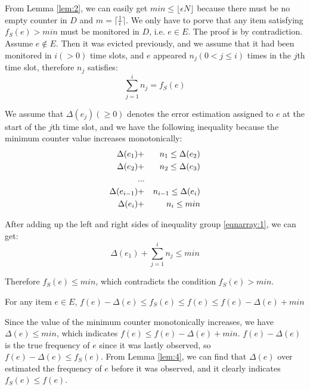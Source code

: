 \documentclass[conference]{IEEEtran}
\begin{document}
\begin{IEEEproof}
From Lemma \ref{lem:2}, we can easily get $min\leq\lfloor \epsilon N\rfloor$ because there must be no empty counter in $D$ and $m=\lceil\frac{1}{\epsilon}\rceil$. We only have to porve that any item satisfying $f_S(e)> min$ must be monitored in $D$, i.e. $e\in E$. The proof is by contradiction. Assume $e\notin E$. Then it was evicted previously, and we assume that it had been monitored in $i(>0)$ time slots, and $e$ appeared $n_j(0<j\leq i)$ times in the $j$th time slot, therefore $n_j$ satisfies:
\begin{equation}\label{equa:2}
\sum_{j=1}^{i}n_j=f_S(e)
\end{equation}\par
We assume that $\Delta(e_j)(\geq 0)$ denotes the error estimation assigned to $e$ at the start of the $j$th time slot, and we have the following inequality because the minimum counter value increases monotonically:
\setlength{\arraycolsep}{0.0em}
\begin{eqnarray}\label{eqnarray:1}
\Delta(e_1)&+&n_1\leq\Delta(e_2)\notag\\
\Delta(e_2)&+&n_2\leq\Delta(e_3)\notag\\
&...&\\
\Delta(e_{i-1})&+&n_{i-1}\leq\Delta(e_i)\notag\\
\Delta(e_i)&+&n_i\leq min \notag
\end{eqnarray}\par
\setlength{\arraycolsep}{5pt}
After adding up the left and right sides of inequality group \ref{eqnarray:1}, we can get:
\begin{equation}\label{equa:3}
\Delta(e_1)+\sum_{j=1}^{i}n_j\leq min
\end{equation}\par
Therefore $f_S(e)\leq min$, which contradicts the condition $f_S(e)>min$.\par
\end{IEEEproof}

\begin{lemma}\label{lem:5}
  For any item $e\in E$, $f(e)-\Delta(e)\leq f_S(e)\leq f(e)\leq f(e)-\Delta(e)+min$
\end{lemma}

\begin{IEEEproof}
Since the value of the minimum counter monotonically increases, we have $\Delta(e)\leq min$, which indicates $f(e)\leq f(e)-\Delta(e)+min$. $f(e)-\Delta(e)$ is the true frequency of $e$ since it was lastly observed, so $f(e)-\Delta(e)\leq f_S(e)$. From Lemma \ref{lem:4}, we can find that $\Delta(e)$ over estimated the frequency of $e$ before it was observed, and it clearly indicates $f_S(e)\leq f(e)$.
\end{IEEEproof}
\end{document}
